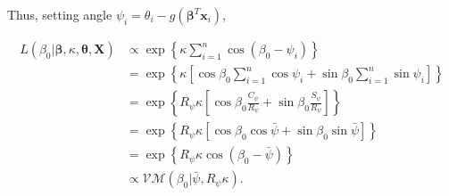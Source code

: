 \documentclass[12pt,a4paper]{article}
\begin{document}
Thus, setting angle $\psi_i = \theta_i - g(\boldsymbol\beta^T \boldsymbol{x}_i)$,


\begin{align*}
L(\beta_0 \vert \boldsymbol\beta, \kappa, \boldsymbol\theta, \boldsymbol{X}) & \propto \exp \left\lbrace \kappa \sum_{i=1}^n \cos ( \beta_0 - \psi_i)  \right\rbrace \\
& = \exp \left\lbrace \kappa   \left[ \cos\beta_0 \sum_{i=1}^n \cos\psi_i +  \sin\beta_0 \sum_{i=1}^n \sin\psi_i \right]  \right\rbrace \\
& = \exp \left\lbrace R_{\psi}  \kappa  \left[ \cos\beta_0 \frac{C_{\psi}}{R_{\psi}} +  \sin\beta_0 \frac{S_{\psi}}{R_{\psi}} \right]  \right\rbrace \\
& = \exp \left\lbrace R_{\psi} \kappa   \left[ \cos\beta_0 \cos{\bar\psi} +  \sin\beta_0 \sin{\bar\psi}\right]  \right\rbrace \\
& = \exp \left\lbrace R_{\psi} \kappa \cos \left( \beta_0 - \bar\psi \right)  \right\rbrace \\
& \propto \mathcal{VM}(\beta_0 \vert \bar\psi, R_{\psi} \kappa).
\end{align*}







\end{document}
